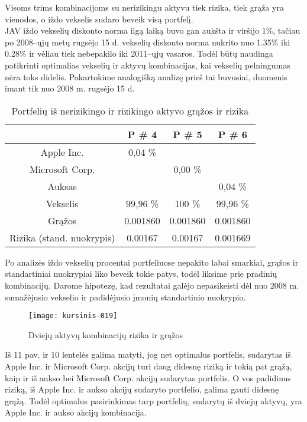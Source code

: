 \documentclass[12pt, a14paper, lithuanian]{article}
\begin{document}
Visoms trims kombinacijoms su nerizikingu aktyvu tiek rizika, tiek grąža yra vienodos, o iždo vekselis sudaro beveik visą portfelį. \\



JAV iždo vekselių diskonto norma ilgą laiką buvo gan aukšta ir viršijo 1\%, tačiau
po 2008--ųjų metų rugsėjo 15 d. vekselių diskonto norma nukrito nuo 1.35\% iki 0.28\% ir vėliau tiek nebepakilo iki 2011--ųjų
vasaros. Todėl būtų naudinga patikrinti optimalias vekselių ir aktyvų kombinacijas, kai vekselių pelningumas
nėra toks didelis. Pakartokime analogišką analizę prieš tai buvusiai, duomenis imant tik nuo 2008 m. rugsėjo 15 d. 

\begin{table}[ht]
\begin{center}
\begin{tabular}{cccc}
  \hline
 & P \# 4 & P \# 5 & P \# 6 \\ 
  \hline
Apple Inc. & 0,04 \% &  &  &  \\
\hline
 Microsoft Corp. &  & 0,00 \% &  &  \\ 
   \hline
   Auksas & & & 0,04 \% &\\
   \hline
   Vekselis & 99,96 \% & 100 \% & 99,96 \% &\\
   \hline
   Grąžos & 0.001860 & 0.001860 & 0.001860 & \\
   \hline
   Rizika (stand. nuokrypis) & 0.00167 & 0.00167 & 0.001669 & \\
   \hline
\end{tabular}
\end{center}
\caption{Portfelių iš nerizikingo ir rizikingo aktyvo grąžos ir rizika}
\end{table}

Po analizės iždo vekselių procentai portfeliuose nepakito labai smarkiai, grąžos ir standartiniai nuokrypiai liko beveik tokie patys, todėl liksime prie pradinių kombinacijų. Darome hipotezę, kad rezultatai galėjo nepasikeisti dėl nuo 2008 m. sumažėjusio vekselio ir padidėjusio įmonių standartinio nuokrypio.




\begin{figure}[H]
  \centering
\texttt{[image: kursinis-019]}
  \caption{Dviejų aktyvų kombinacijų rizika ir grąžos}
\end{figure}  

Iš 11 pav. ir 10 lentelės galima matyti, jog net optimalus portfelis, sudarytas iš Apple Inc. ir Microsoft Corp. akcijų turi daug
didesnę riziką ir tokią pat grąžą, kaip ir iš aukso bei Microsoft Corp. akcijų sudarytas portfelis. O vos padidinus riziką,
iš Apple Inc. ir aukso akcijų sudaryto portfelio, galima gauti didesnę grąžą. Todėl optimalus pasirinkimas
tarp portfelių, sudarytų iš dviejų aktyvų, yra Apple Inc. ir aukso akcijų kombinacija.
\end{document}
